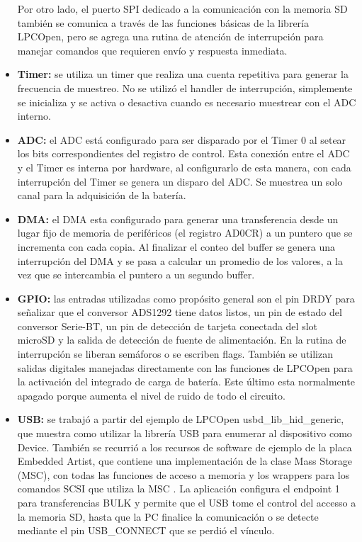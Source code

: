 \begin{itemize}
	Por otro lado, el puerto SPI dedicado a la comunicación con la memoria SD también se comunica a través de las funciones básicas de la librería LPCOpen, pero se agrega una rutina de atención de interrupción para manejar comandos que requieren envío y respuesta inmediata.

	\item \textbf{Timer:} se utiliza un timer que realiza una cuenta repetitiva para generar la frecuencia de muestreo. No se utilizó el handler de interrupción, simplemente se inicializa y se activa o desactiva cuando es necesario muestrear con el ADC interno.

	\item \textbf{ADC:} el ADC está configurado para ser disparado por el Timer 0 al setear los bits correspondientes del registro de control. Esta conexión entre el ADC y el Timer es interna por hardware, al configurarlo de esta manera, con cada interrupción del Timer se genera un disparo del ADC. Se muestrea un solo canal para la adquisición de la batería.
	
	\item \textbf{DMA:} el DMA esta configurado para generar una transferencia desde un lugar fijo de memoria de periféricos (el registro AD0CR) a un puntero que se incrementa con cada copia. Al finalizar el conteo del buffer se genera una interrupción del DMA y se pasa a calcular un promedio de los valores, a la vez que se intercambia el puntero a un segundo buffer.
	
 	\item \textbf{GPIO:} las entradas utilizadas como propósito general son el pin DRDY para señalizar que el conversor ADS1292 tiene datos listos, un pin de estado del conversor Serie-BT, un pin de detección de tarjeta conectada del slot microSD y la salida de detección de fuente de alimentación. En la rutina de interrupción se liberan semáforos o se escriben flags. También se utilizan salidas digitales manejadas directamente con las funciones de LPCOpen para la activación del integrado de carga de batería. Este último esta normalmente apagado porque aumenta el nivel de ruido de todo el circuito.

	\item \textbf{USB:} se trabajó a partir del ejemplo de LPCOpen usbd\_lib\_hid\_generic, que muestra como utilizar la librería USB para enumerar al dispositivo como Device. También se recurrió a los recursos de software de ejemplo de la placa Embedded Artist\citep{ea2013}, que contiene una implementación de la clase Mass Storage (MSC), con todas las funciones de acceso a memoria y los wrappers para los comandos SCSI que utiliza la MSC \citep{arm2019} \citep{peacock2002} \citep{axelson2006}. La aplicación configura el endpoint 1 para transferencias BULK y permite que el USB tome el control del accesso a la memoria SD, hasta que la PC finalice la comunicación o se detecte mediante el pin USB\_CONNECT que se perdió el vínculo.

\end{itemize}

